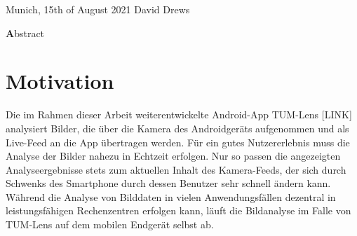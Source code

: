 \documentclass[
			   fontsize=11pt,
               paper=a4,
               bibliography=totoc,
               idxtotoc,
               headsepline,
               footsepline,
               footinclude=false,
               BCOR=12mm,
               DIV=13,
               openany,   %
               ]
               {scrbook}
\def\author{David Drews}
\def\date{15th of August 2021}
\begin{document}
\vspace{15mm}
\noindent
Munich, \date \hspace{5cm} \author
\cleardoubleemptypage


{}
\vspace*{2cm}
\begin{center}
    {\Large \textbf Abstract}
\end{center}
\vspace{1cm}

\lipsum[2]

\cleardoublepage


\printglossary[type=\acronymtype,nonumberlist]
\cleardoublepage

\printglossary[nonumberlist]
\cleardoublepage


\tableofcontents
\thispagestyle{empty}
\cleardoubleemptypage


\mainmatter
\chapter{Motivation}

Die im Rahmen dieser Arbeit weiterentwickelte Android-App TUM-Lens [LINK] analysiert Bilder, die über die Kamera des Androidgeräts aufgenommen und als Live-Feed an die App übertragen werden. Für ein gutes Nutzererlebnis muss die Analyse der Bilder nahezu in Echtzeit erfolgen. Nur so passen die angezeigten Analyseergebnisse stets zum aktuellen Inhalt des Kamera-Feeds, der sich durch Schwenks des Smartphone durch dessen Benutzer sehr schnell ändern kann. Während die Analyse von Bilddaten in vielen Anwendungsfällen dezentral in leistungsfähigen Rechenzentren erfolgen kann, läuft die Bildanalyse im Falle von TUM-Lens auf dem mobilen Endgerät selbst ab.
\end{document}
